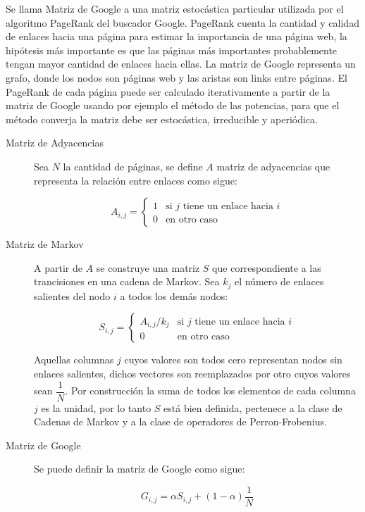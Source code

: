 \documentclass{article}
\begin{document}
Se llama Matriz de Google a una matriz estocástica particular utilizada por el algoritmo PageRank del buscador Google.
PageRank cuenta la cantidad y calidad de enlaces hacia una página para estimar la importancia de una página web, la hipótesis más importante es que las páginas más importantes probablemente tengan mayor cantidad de enlaces hacia ellas.
La matriz de Google representa un grafo, donde los nodos son páginas web y las aristas son links entre páginas. El PageRank de cada página puede ser calculado iterativamente a partir de la matriz de Google usando por ejemplo el método de las potencias, para que el método converja la matriz debe ser estocástica, irreducible y aperiódica. 
\begin{description}
\item[Matriz de Adyacencias]

Sea $N$ la cantidad de páginas, se define $A$ matriz de adyacencias que representa la relación entre enlaces como sigue:

\begin{equation} \label{eq:A}
A_{i,j} =
\left\{
	\begin{array}{ll}
		1  & \mbox{si $j$ tiene un enlace hacia $i$}\\
		0 & \mbox{en otro caso } 
	\end{array}
\right.
\end{equation}

\item[Matriz de Markov]
A partir de $A$ se construye una matriz $S$ que correspondiente a las trancisiones en una cadena de Markov. Sea $k_j$ el número de enlaces salientes del nodo $i$ a todos los demás nodos:

\begin{equation} \label{eq:S}
S_{i,j} =
\left\{
	\begin{array}{ll}
		A_{i,j}/k_{j}  & \mbox{si $j$ tiene un enlace hacia $i$}\\
		0 & \mbox{en otro caso } 
	\end{array}
\right.
\end{equation}

Aquellas columnas $j$ cuyos valores son todos cero representan nodos sin enlaces salientes, dichos vectores son reemplazados por otro cuyos valores sean $\dfrac {1} {N}$.
Por construcción la suma de todos los elementos de cada columna $j$ es la unidad, por lo tanto $S$ está bien definida, pertenece a la clase de Cadenas de Markov y a la clase de operadores de Perron-Frobenius.

\item[Matriz de Google]

Se puede definir la matriz de Google como sigue:

\begin{equation} \label{eq:G}
G_{i,j} = \alpha S_{i,j} + (1-\alpha) \dfrac {1} {N}
\end{equation}

\end{description} 
 
\end{document}
